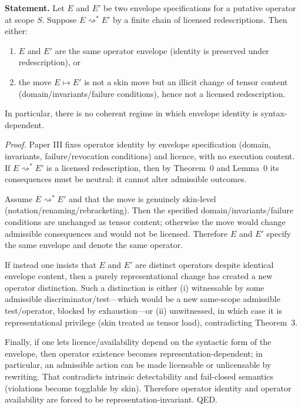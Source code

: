 \documentclass[12pt]{article}
\theoremstyle{plain}
\begin{document}
\medskip

\noindent\textbf{Statement.} Let $E$ and $E'$ be two envelope specifications for a putative operator at scope $S$. Suppose $E\rightsquigarrow^* E'$ by a finite chain of licensed redescriptions. Then either:
\begin{enumerate}[leftmargin=*]
\item $E$ and $E'$ are the same operator envelope (identity is preserved under redescription), or
\item the move $E\mapsto E'$ is not a skin move but an illicit change of tensor content (domain/invariants/failure conditions), hence not a licensed redescription.
\end{enumerate}
In particular, there is no coherent regime in which envelope identity is syntax-dependent.

\textit{Proof.} Paper III fixes operator identity by envelope specification (domain, invariants, failure/revocation conditions) and licence, with no execution content. If $E\rightsquigarrow^* E'$ is a licensed redescription, then by Theorem~0 and Lemma~0 its consequences must be neutral: it cannot alter admissible outcomes.

Assume $E\rightsquigarrow^* E'$ and that the move is genuinely skin-level (notation/renaming/rebracketing). Then the specified domain/invariants/failure conditions are unchanged as tensor content; otherwise the move would change admissible consequences and would not be licensed. Therefore $E$ and $E'$ specify the same envelope and denote the same operator.

If instead one insists that $E$ and $E'$ are distinct operators despite identical envelope content, then a purely representational change has created a new operator distinction. Such a distinction is either (i) witnessable by some admissible discriminator/test---which would be a new same-scope admissible test/operator, blocked by exhaustion---or (ii) unwitnessed, in which case it is representational privilege (skin treated as tensor load), contradicting Theorem~3.

Finally, if one lets licence/availability depend on the syntactic form of the envelope, then operator existence becomes representation-dependent; in particular, an admissible action can be made licensable or unlicensable by rewriting. That contradicts intrinsic detectability and fail-closed semantics (violations become togglable by skin). Therefore operator identity and operator availability are forced to be representation-invariant. QED.
\end{document}
